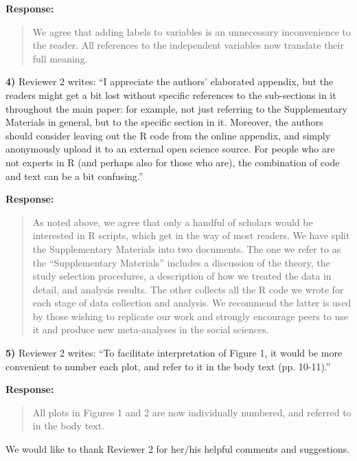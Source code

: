 \documentclass[a4paper,12pt]{article}
\begin{document}
\vspace{.3cm}

\noindent \textbf{Response:} 
\begin{quote}
    We agree that adding labels to variables is an unnecessary inconvenience to the reader. All references to the independent variables now translate their full meaning.
\end{quote}

\vspace{.3cm}

\noindent \textbf{4)} Reviewer 2 writes: ``I appreciate the authors' elaborated appendix, but the readers might get a bit lost without specific references to the sub-sections in it throughout the main paper: for example, not just referring to the Supplementary Materials in general, but to the specific section in it. Moreover, the authors should consider leaving out the R code from the online appendix, and simply anonymously upload it to an external open science source. For people who are not experts in R (and perhaps also for those who are), the combination of code and text can be a bit confusing.''

\vspace{.3cm}

\noindent \textbf{Response:} 
\begin{quote}
    As noted above, we agree that only a handful of scholars would be interested in R scripts, which get in the way of most readers. We have split the Supplementary Materials into two documents. The one we refer to as the ``Supplementary Materials'' includes a discussion of the theory, the study selection procedures, a description of how we treated the data in detail, and analysis results. The other collects all the R code we wrote for each stage of data collection and analysis. We recommend the latter is used by those wishing to replicate our work and strongly encourage peers to use it and produce new meta-analyses in the social sciences.
\end{quote}

\vspace{.3cm}

\noindent \textbf{5)} Reviewer 2 writes: ``To facilitate interpretation of Figure 1, it would be more convenient to number each plot, and refer to it in the body text (pp. 10-11).''

\vspace{.3cm}

\noindent \textbf{Response:} 
\begin{quote}
    All plots in Figures 1 and 2 are now individually numbered, and referred to in the body text.
\end{quote}

We would like to thank Reviewer 2 for her/his helpful comments and suggestions.

\newpage


\end{document}
